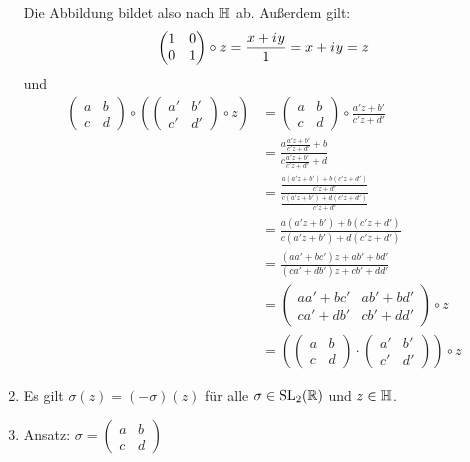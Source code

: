 \begin{beweis}
\begin{enumerate}[label=\alph*)]
              Die Abbildung bildet also nach $\mathbb{H}$ ab. Außerdem gilt:
              \[\begin{pmatrix}1&0\\0&1\end{pmatrix} \circ z = \frac{x+{i\mkern1mu} y}{1} = x + {i\mkern1mu} y = z\]
              und
              \begin{align*}
                \begin{pmatrix}a&b\\c&d\end{pmatrix} \circ  \left ( \begin{pmatrix}a'&b'\\c'&d'\end{pmatrix}   \circ z \right )&=
                            \begin{pmatrix}a&b\\c&d\end{pmatrix} \circ \frac{a'z + b'}{c'z + d'}\\
                    &= \frac{a \frac{a'z + b'}{c'z + d'} + b}{c \frac{a'z + b'}{c'z + d'} + d}\\
                    &= \frac{\frac{a(a'z+b') + b(c'z+d')}{c'z+d'}}{\frac{c(a'z+b')+d(c'z+d')}{c'z+d'}}\\
                    &= \frac{a(a'z+b')+b(c'z+d')}{c(a'z+b') + d(c'z+d')}\\
                    &= \frac{(aa'+bc')z + ab' + bd'}{(ca'+db')z + cb' + dd'}\\
                    &= \begin{pmatrix}aa'+bc'&ab'+bd'\\ca'+db'&cb'+dd'\end{pmatrix} \circ z\\
                    &= \left ( \begin{pmatrix}a&b\\c&d\end{pmatrix} \cdot \begin{pmatrix}a'&b'\\c'&d'\end{pmatrix} \right ) \circ z 
              \end{align*}
        \item Es gilt $\sigma(z) = (-\sigma)(z)$ für alle $\sigma \in \mathrm{SL}_2(\mathbb{R})$
              und $z \in \mathbb{H}$.
        \item Ansatz: $\sigma = \begin{pmatrix}a & b\\c & d\end{pmatrix}$

\end{enumerate}
\end{beweis}
